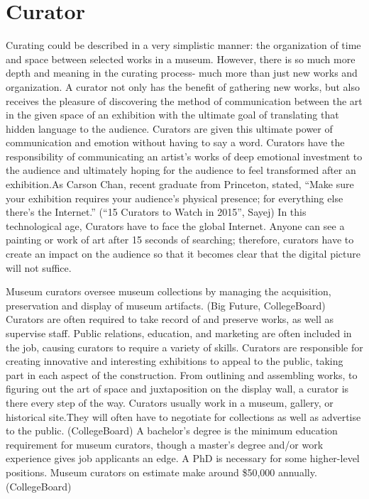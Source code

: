 \chapter{Curator}
\begin{multicols}{2}

Curating could be described in a very simplistic manner: the organization of time and space between selected works in a museum. However, there is so much more depth and meaning in the curating process- much more than just new works and organization. A curator not only has the benefit of gathering new works, but also receives the pleasure of discovering the method of communication between the art in the given space of an exhibition with the ultimate goal of translating that hidden language to the audience. Curators are given this ultimate power of communication and emotion without having to say a word. Curators have the responsibility of communicating an artist’s works of deep emotional investment to the audience and ultimately hoping for the audience to feel transformed after an exhibition.As Carson Chan, recent graduate from Princeton, stated, “Make sure your exhibition requires your audience’s physical presence; for everything else there’s the Internet.” (“15 Curators to Watch in 2015”, Sayej) In this technological age, Curators have to face the global Internet. Anyone can see a painting or work of art after 15 seconds of searching; therefore, curators have to create an impact on the audience so that it becomes clear that the digital picture will not suffice. 

Museum curators oversee museum collections by managing the acquisition, preservation and display of museum artifacts. (Big Future, CollegeBoard) Curators are often required to take record of and preserve works, as well as supervise staff. Public relations, education, and marketing are often included in the job, causing curators to require a variety of skills. Curators are responsible for creating innovative and interesting exhibitions to appeal to the public, taking part in each aspect of the construction. From outlining and assembling works, to figuring out the art of space and juxtaposition on the display wall, a curator is there every step of the way. Curators usually work in a museum, gallery, or historical site.They will often have to negotiate for collections as well as advertise to the public. (CollegeBoard) A bachelor's degree is the minimum education requirement for museum curators, though a master's degree and/or work experience gives job applicants an edge. A PhD is necessary for some higher-level positions. Museum curators on estimate make around \$50,000 annually. (CollegeBoard)

\end{multicols}

